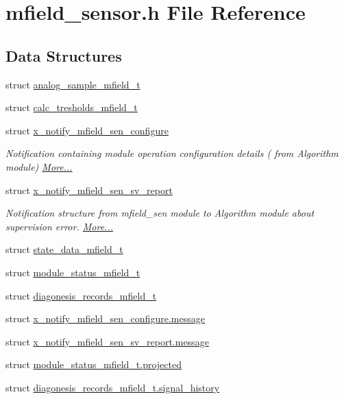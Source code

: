 \hypertarget{a00019}{\section{mfield\+\_\+sensor.\+h File Reference}
\label{a00019}
}
\subsection*{Data Structures}
\begin{DoxyCompactItemize}
\item 
struct \hyperlink{a00019_d4/d81/a00110}{analog\+\_\+sample\+\_\+mfield\+\_\+t}
\item 
struct \hyperlink{a00019_d9/d0d/a00298}{calc\+\_\+tresholds\+\_\+mfield\+\_\+t}
\item 
struct \hyperlink{a00019_d2/d5e/a00860}{x\+\_\+notify\+\_\+mfield\+\_\+sen\+\_\+configure}
\begin{DoxyCompactList}\small\item\em Notification containing module operation configuration details ( from Algorithm module)  \hyperlink{a00019_d2/d5e/a00860}{More...}\end{DoxyCompactList}\item 
struct \hyperlink{a00019_dc/d41/a00862}{x\+\_\+notify\+\_\+mfield\+\_\+sen\+\_\+sv\+\_\+report}
\begin{DoxyCompactList}\small\item\em Notification structure from mfield\+\_\+sen module to Algorithm module about supervision error.  \hyperlink{a00019_dc/d41/a00862}{More...}\end{DoxyCompactList}\item 
struct \hyperlink{a00019_df/d0c/a00788}{state\+\_\+data\+\_\+mfield\+\_\+t}
\item 
struct \hyperlink{a00019_d6/db2/a00601}{module\+\_\+status\+\_\+mfield\+\_\+t}
\item 
struct \hyperlink{a00019_d9/dc1/a00388}{diagonesis\+\_\+records\+\_\+mfield\+\_\+t}
\item 
struct \hyperlink{a00019_dd/dd5/a00861}{x\+\_\+notify\+\_\+mfield\+\_\+sen\+\_\+configure.\+message}
\item 
struct \hyperlink{a00019_d7/d49/a00863}{x\+\_\+notify\+\_\+mfield\+\_\+sen\+\_\+sv\+\_\+report.\+message}
\item 
struct \hyperlink{a00019_d5/d0a/a00602}{module\+\_\+status\+\_\+mfield\+\_\+t.\+projected}
\item 
struct \hyperlink{a00019_d4/d27/a00392}{diagonesis\+\_\+records\+\_\+mfield\+\_\+t.\+signal\+\_\+history}

\end{DoxyCompactItemize}
